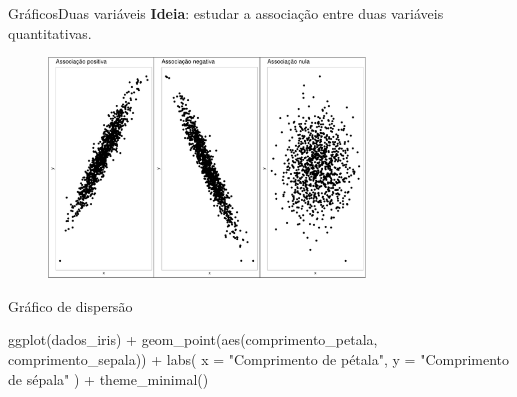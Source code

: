 \documentclass[
  10pt,
  ignorenonframetext,
]{beamer}
\newenvironment{Shaded}{\begin{snugshade}}{\end{snugshade}}
\newcommand{\AttributeTok}[1]{\textcolor[rgb]{0.40,0.45,0.13}{#1}}
\newcommand{\FunctionTok}[1]{\textcolor[rgb]{0.28,0.35,0.67}{#1}}
\newcommand{\NormalTok}[1]{\textcolor[rgb]{0.00,0.23,0.31}{#1}}
\newcommand{\SpecialCharTok}[1]{\textcolor[rgb]{0.37,0.37,0.37}{#1}}
\newcommand{\StringTok}[1]{\textcolor[rgb]{0.13,0.47,0.30}{#1}}
\begin{document}
\begin{frame}{Gráficos\newline Duas variáveis}
\protect\hypertarget{gruxe1ficosduas-variuxe1veis}{}
\textbf{Ideia}: estudar a associação entre duas variáveis quantitativas.

\begin{figure}

{\centering \includegraphics[width=0.75\textwidth,height=\textheight]{exploracao-visualizacao_files/figure-beamer/unnamed-chunk-125-1.pdf}

}

\end{figure}
\end{frame}

\begin{frame}[fragile]{Gráfico de dispersão}
\protect\hypertarget{gruxe1fico-de-dispersuxe3o}{}
\begin{Shaded}
\begin{Highlighting}[]
\FunctionTok{ggplot}\NormalTok{(dados\_iris) }\SpecialCharTok{+}
  \FunctionTok{geom\_point}\NormalTok{(}\FunctionTok{aes}\NormalTok{(comprimento\_petala, comprimento\_sepala)) }\SpecialCharTok{+}
  \FunctionTok{labs}\NormalTok{(}
    \AttributeTok{x =} \StringTok{"Comprimento de pétala"}\NormalTok{,}
    \AttributeTok{y =} \StringTok{"Comprimento de sépala"}
\NormalTok{  ) }\SpecialCharTok{+}
  \FunctionTok{theme\_minimal}\NormalTok{()}
\end{Highlighting}
\end{Shaded}
\end{frame}
\end{document}
